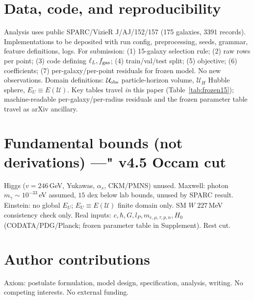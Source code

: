 \documentclass[twocolumn]{aastex631}
\begin{document}
\section*{Data, code, and reproducibility}

Analysis uses public SPARC/VizieR J/AJ/152/157 (175 galaxies, 3391 records). Implementations to be deposited with run config, preprocessing, seeds, grammar, feature definitions, logs. For submission: (1) 15-galaxy selection rule; (2) raw rows per point; (3) code defining $\ell_{L},f_{\rm gas}$; (4) train/val/test split; (5) objective; (6) coefficients; (7) per-galaxy/per-point residuals for frozen model. No new observations. Domain definitions: $\mathcal U_{\rm obs}$ particle-horizon volume, $\mathcal U_{H}$ Hubble sphere, $E_{U}\equiv E(\mathcal U)$. Key tables travel \emph{in} this paper (Table~\ref{tab:frozen15}); machine-readable per-galaxy/per-radius residuals and the frozen parameter table travel as arXiv ancillary.

\section*{Fundamental bounds (not derivations) ---" v4.5 Occam cut}
Higgs ($v=246$\,GeV, Yukawas, $\alpha_{s}$, CKM/PMNS) unused. Maxwell: photon $m_{\gamma}\sim10^{-33}$\,eV assumed, $15$ dex below lab bounds, unused by SPARC result. Einstein: no global $E_{U}$; $E_{U}\equiv E(\mathcal U)$ finite domain only. SM $W$ $227$\,MeV consistency check only. Real inputs: $c,\hbar,G,l_{P},m_{e,\mu,\tau,p,n},H_{0}$ (CODATA/PDG/Planck; frozen parameter table in Supplement). Rest cut.

\section*{Author contributions}
Axiom: postulate formulation, model design, specification, analysis, writing. No competing interests. No external funding.
\end{document}
